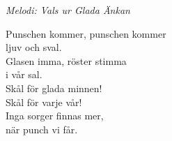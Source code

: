 {\footnotesize\textit{Melodi: Vals ur Glada Änkan}}\par
\vspace{10pt}
Punschen kommer, punschen kommer\\
ljuv och sval.\\
Glasen imma, röster stimma\\
i vår sal.\\
Skål för glada minnen!\\
Skål för varje vår!\\
Inga sorger finnas mer,\\
när punch vi får.
